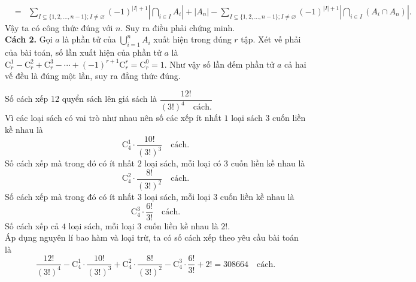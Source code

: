 \begin{vd}
{\begin{tongquat}
{\begin{eqnarray*}
					&=&\displaystyle\sum\limits_{I\subseteq\{1,2,\ldots,n-1\};I\ne\varnothing }(-1)^{\left|I\right|+1}\left|\bigcap\limits_{i\in I}A_i\right|+\left|A_n\right|-\displaystyle\sum\limits_{I\subseteq\{1,2,\ldots,n-1\};I\ne \varnothing}(-1)^{\left|I\right|+1}\left|\bigcap\limits_{i\in I}\left(A_i\cap A_n\right)\right|.
				\end{eqnarray*}
				Vậy ta có công thức đúng với $n$. Suy ra điều phải chứng minh.\\
				\textbf{Cách 2.} Gọi $a$ là phần tử của $\bigcup\limits_{i=1}^nA_i$ xuất hiện trong đúng $r$ tập. Xét vế phải của bài toán, số lần xuất hiện của phần tử $a$ là $\mathrm{C}_r^1-\mathrm{C}_r^2+\mathrm{C}_r^3-\cdots+(-1)^{r+1}\mathrm{C}_r^r=\mathrm{C}_r^0=1$. Như vậy số lần đếm phần tử $a$ cả hai vế đều là đúng một lần, suy ra đẳng thức đúng.}
		\end{tongquat}
		\noindent
		Số cách xếp $12$ quyển sách lên giá sách là $\dfrac{12!}{\left(3!\right)^4\quad \text{cách.}}$\\
		Vì các loại sách có vai trò như nhau nên số các xếp ít nhất $1$ loại sách $3$ cuốn liền kề nhau là \[\mathrm{C}^1_4 \cdot \dfrac{10!}{\left(3!\right)^3}\quad \text{cách.}\]
		Số cách xếp mà trong đó có ít nhất $2$ loại sách, mỗi loại có $3$ cuốn liền kề nhau là
		\[\mathrm{C}^2_4 \cdot \dfrac{8!}{\left(3!\right)^2}\quad \text{cách.}\]
		Số cách xếp mà trong đó có ít nhất $3$ loại sách, mỗi loại $3$ cuốn liền kề nhau là
		\[\mathrm{C}^3_4 \cdot \dfrac{6!}{3!}\quad \text{cách.}\]
		Số cách xếp cả $4$ loại sách, mỗi loại $3$ cuốn liền kề nhau là $2!$.\\
		Áp dụng nguyên lí bao hàm và loại trừ, ta có số cách xếp theo yêu cầu bài toán là
		\begin{equation*}
		\dfrac{12!}{\left(3!\right)^4}-\mathrm{C}^1_4 \cdot \dfrac{10!}{\left(3!\right)^3}+\mathrm{C}^2_4 \cdot \dfrac{8!}{\left(3!\right)^2}-\mathrm{C}^3_4 \cdot \dfrac{6!}{3!}+2!=308664 \quad \text{cách.}
		\end{equation*}
	}
\end{vd}
